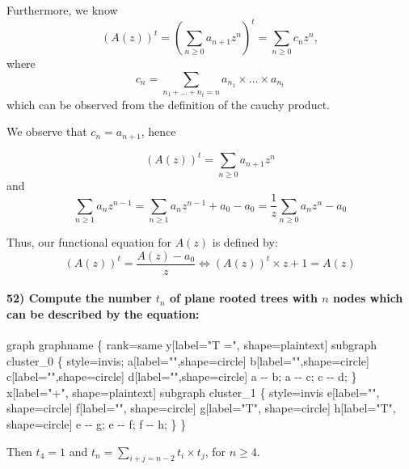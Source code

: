 \documentclass[
]{article}
\newenvironment{Shaded}{}{}
\newcommand{\NormalTok}[1]{#1}
\begin{document}
Furthermore, we know \[
(A(z))^t = (\sum_{n \geq 0} a_{n+1}z^n)^t = \sum_{n \geq 0} c_n z^n,
\] where \[
c_n = \sum_{n_1 + \dots + n_t = n} a_{n_1} \times \dots \times a_{n_t}
\] which can be observed from the definition of the cauchy product.

We observe that \(c_n=a_{n+1}\), hence

\[
(A(z))^t = \sum_{n \geq 0} a_{n+1}z^n
\] and \[
\sum_{n \geq 1} a_n z^{n-1} = \sum_{n \geq 1} a_n z^{n-1} + a_0 - a_0 = \frac{1}{z} \sum_{n \geq 0} a_n z^n - a_0
\]

Thus, our functional equation for \(A(z)\) is defined by: \[
(A(z))^t = \frac{A(z)-a_0}{z} \Leftrightarrow (A(z))^t \times z + 1 = A(z)
\]

\hypertarget{compute-the-number-t_n-of-plane-rooted-trees-with-n-nodes-which-can-be-described-by-the-equation}{%
\paragraph{\texorpdfstring{52) Compute the number \(t_n\) of plane
rooted trees with \(n\) nodes which can be described by the
equation:}{52) Compute the number t\_n of plane rooted trees with n nodes which can be described by the equation:}}\label{compute-the-number-t_n-of-plane-rooted-trees-with-n-nodes-which-can-be-described-by-the-equation}}

\begin{Shaded}
\begin{Highlighting}[]
\NormalTok{graph graphname \{ }
\NormalTok{rank=same}
\NormalTok{y[label="T =", shape=plaintext]}
\NormalTok{subgraph cluster\_0 \{}
\NormalTok{style=invis;}
\NormalTok{a[label="",shape=circle]}
\NormalTok{b[label="",shape=circle]}
\NormalTok{c[label="",shape=circle]}
\NormalTok{d[label="",shape=circle]}
\NormalTok{        a {-}{-} b; }
\NormalTok{        a {-}{-} c;}
\NormalTok{        c {-}{-} d;}
\NormalTok{    \}}
\NormalTok{x[label="+", shape=plaintext]}
\NormalTok{subgraph cluster\_1 \{}
\NormalTok{style=invis}
\NormalTok{e[label="", shape=circle]}
\NormalTok{f[label="", shape=circle]}
\NormalTok{g[label="T", shape=circle]}
\NormalTok{h[label="T", shape=circle]}
\NormalTok{        e {-}{-} g;}
\NormalTok{        e {-}{-} f; }
\NormalTok{        f {-}{-} h;}
\NormalTok{    \}}
\NormalTok{\} }
\end{Highlighting}
\end{Shaded}

Then \(t_4 = 1\) and \(t_n = \sum_{i+j=n-2} t_i \times t_j\), for
\(n \geq 4\).
\end{document}
